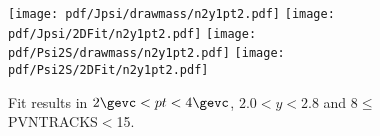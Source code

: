 \begin{figure}[H]
\begin{center}
\texttt{[image: pdf/Jpsi/drawmass/n2y1pt2.pdf]}
\texttt{[image: pdf/Jpsi/2DFit/n2y1pt2.pdf]}
\vspace*{-0.5cm}
\texttt{[image: pdf/Psi2S/drawmass/n2y1pt2.pdf]}
\texttt{[image: pdf/Psi2S/2DFit/n2y1pt2.pdf]}
\vspace*{-0.5cm}
\end{center}
\caption{Fit results in $2\gevc<pt<4\gevc$, $2.0<y<2.8$ and 8$\leq$PVNTRACKS$<$15.}
\label{Fitn2y1pt2}
\end{figure}

